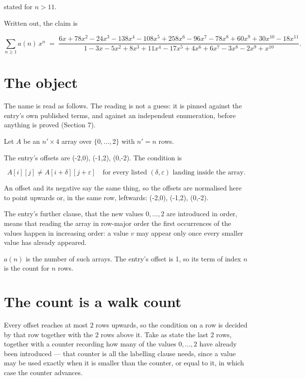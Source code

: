 \documentclass[11pt]{article}
\theoremstyle{definition}
\begin{document}
stated for $n > 11$.

Written out, the claim is

\[\sum_{n \ge 1} a(n)\,x^n \;=\; \frac{6x + 78x^{2} - 24x^{3} - 138x^{4} - 108x^{5} + 258x^{6} - 96x^{7} - 78x^{8} + 60x^{9} + 30x^{10} - 18x^{11}}{1 - 3x - 5x^{2} + 8x^{3} + 11x^{4} - 17x^{5} + 4x^{6} + 6x^{7} - 3x^{8} - 2x^{9} + x^{10}}.\]

\section{The object}

The name is read as follows. The reading is not a guess: it is pinned against the entry's own published terms, and against an independent enumeration, before anything is proved (Section 7).

Let $A$ be an $n' \times 4$ array over $\{0,\dots,2\}$ with $n' = n$ rows.

The entry's offsets are (-2,0), (-1,2), (0,-2). The condition is

\[A[i][j] \ne A[i{+}\delta][j{+}\varepsilon]\quad\text{for every listed }(\delta,\varepsilon)\text{ landing inside the array.}\]

An offset and its negative say the same thing, so the offsets are normalised here to point upwards or, in the same row, leftwards: (-2,0), (-1,2), (0,-2).

The entry's further clause, that the new values $0,\dots,2$ are introduced in order, means that reading the array in row-major order the first occurrences of the values happen in increasing order: a value $v$ may appear only once every smaller value has already appeared.

$a(n)$ is the number of such arrays. The entry's offset is 1, so its term of index $n$ is the count for $n$ rows.

\section{The count is a walk count}

Every offset reaches at most $2$ rows upwards, so the condition on a row is decided by that row together with the $2$ rows above it. Take as state the last $2$ rows, together with a counter recording how many of the values $0,\dots,2$ have already been introduced --- that counter is all the labelling clause needs, since a value may be used exactly when it is smaller than the counter, or equal to it, in which case the counter advances.
\end{document}
